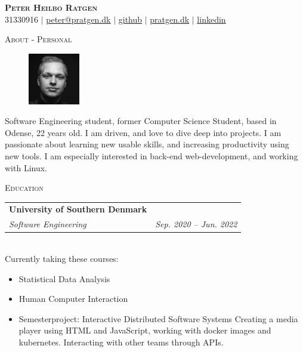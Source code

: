 \documentclass[11pt]{article}
\makeatletter
\newcommand{\resumeSubheading}[4]{
  \noindent\begin{tabular*}{0.98\textwidth}[t]{l@{\extracolsep{\fill}}r}
    \noindent \textbf{#1} & #2 \\ \vspace{-3pt} 
    \noindent \textit{\small#3} & \textit{\small #4} 
  \end{tabular*}\vspace{7pt}
}
\makeatother
\begin{document}
\begin{center}
  \textbf{\huge{\scshape{Peter Heilbo Ratgen}}}\\ 
  \vspace{0.2cm}
  \small 31330916 $|$
  \href{mailto:peter@pratgen.dk}{\underline{peter@pratgen.dk}} $|$
  \href{https://github.com/PeterRatgen }{\underline{github}} $|$
  \href{https://pratgen.dk}{\underline{pratgen.dk}} $|$
  \href{https://www.linkedin.com/in/peter-ratgen-a1236529/}{\underline{linkedin}}
\end{center}

\noindent\large{\scshape{About - Personal}} \newline
\noindent{\rule[0.3cm]{\textwidth}{0.4pt}}

  \begin{figure}
    \vspace{-0.7cm}
    \includegraphics[width=0.2\textwidth]{./okay.jpg}
  \end{figure}
{\normalsize Software Engineering student, former Computer Science Student, based
  in Odense, 22 years old. I am driven, and love to dive deep into projects. I
  am passionate about learning new usable skills, and increasing productivity
  using new tools. I am especially interested in back-end web-development, and
  working with Linux. 
  
  
}

\vspace{0.3cm}
\noindent\large{\scshape{Education}} \newline
\noindent{\rule[0.3cm]{\textwidth}{0.4pt}}

\resumeSubheading{University of Southern Denmark}{}{Software Engineering}{Sep.
2020 -- Jun. 2022}\\\vspace{0.25cm}
{\indent\small Currently taking these courses:}
  \vspace{-0.3cm}
  {\small 
  \begin{itemize}
  \setlength{\itemsep}{-1pt}
    \item Statistical Data Analysis
    \item Human Computer Interaction
    \item Semesterproject: Interactive Distributed Software Systems
      \subitem Creating a media player using HTML and JavaScript, working with
      docker images and kubernetes. Interacting with other teams through APIs.
\end{itemize}} \vspace{0.3cm}
\end{document}
